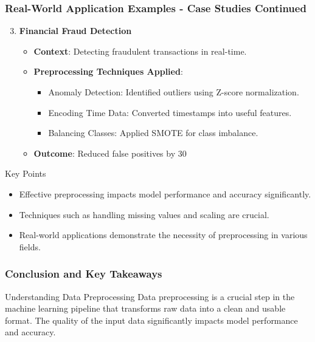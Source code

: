 \documentclass[aspectratio=169]{beamer}
\begin{document}
\begin{frame}[fragile]
    \frametitle{Real-World Application Examples - Case Studies Continued}
    \begin{enumerate}
        \setcounter{enumi}{2}
        \item \textbf{Financial Fraud Detection}
            \begin{itemize}
                \item \textbf{Context}: Detecting fraudulent transactions in real-time.
                \item \textbf{Preprocessing Techniques Applied}:
                    \begin{itemize}
                        \item Anomaly Detection: Identified outliers using Z-score normalization.
                        \item Encoding Time Data: Converted timestamps into useful features.
                        \item Balancing Classes: Applied SMOTE for class imbalance.
                    \end{itemize}
                \item \textbf{Outcome}: Reduced false positives by 30%
            \end{itemize}
    \end{enumerate}
    \begin{block}{Key Points}
        \begin{itemize}
            \item Effective preprocessing impacts model performance and accuracy significantly.
            \item Techniques such as handling missing values and scaling are crucial.
            \item Real-world applications demonstrate the necessity of preprocessing in various fields.
        \end{itemize}
    \end{block}
\end{frame}

\begin{frame}[fragile]
    \frametitle{Conclusion and Key Takeaways}
    \begin{block}{Understanding Data Preprocessing}
        Data preprocessing is a crucial step in the machine learning pipeline that transforms raw data into a clean and usable format. The quality of the input data significantly impacts model performance and accuracy.
    \end{block}
\end{frame}
\end{document}
